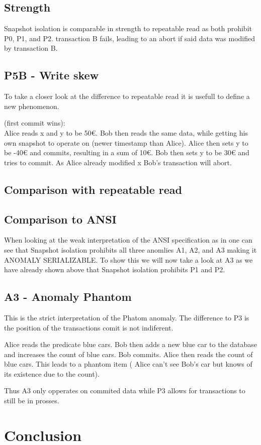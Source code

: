 \documentclass[sigconf, review=true]{acmart}
\begin{document}
\subsection{Strength}
Snapshot isolation is comparable in strength to repeatable read as both prohibit P0, P1, and P2.
transaction B fails, leading to an abort if said data was modified by transaction B.
\subsection{P5B - Write skew}
To take a closer look at the difference to repeatable read it is usefull to define a new phenomenon.
\begin{example}
    (first commit wins): \\
    Alice reads x and y to be 50€. Bob then reads the same data, while getting his own snapshot
    to operate on (newer timestamp than Alice). Alice then sets y to be -40€ and commits,
    resulting in a sum of 10€. Bob then sets y to be 30€ and tries to commit. As Alice already
    modified x Bob’s transaction will abort.
\end{example}
\subsection{Comparison with repeatable read}
\subsection{Comparison to ANSI}
When looking at the weak interpretation of the ANSI specification as in \cite{Adya_Liskov_O_Neil_2000}
one can see that Snapshot isolation prohibits all three anomlies A1, A2, and A3 making it ANOMALY SERIALIZABLE.
To show this we will now take a look at A3 as we have already shown above that Snapshot isolation prohibits P1 and P2.
\subsection{A3 - Anomaly Phantom}
This is the strict interpretation of the Phatom anomaly. The difference to P3 is the position of the
transactions comit is not indiferent.
\begin{example}
    Alice reads the predicate blue cars. Bob then adds a new blue car to the database and increases
    the count of blue cars. Bob commits.  Alice then reads the count of blue cars. This leads to a phantom item
    ( Alice can’t see Bob's car but knows of its existence due to the count).
\end{example}
Thus A3 only opperates on commited data while P3 allows for transactions to still be in prosses.
\section{Conclusion}


\end{document}
